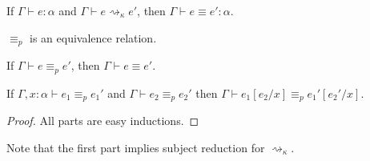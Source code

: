 \begin{lemma}
\begin{thmlist}
\item If $\Gamma\vdash e:\alpha$ and $\Gamma\vdash e\rightsquigarrow_\kappa e'$, then $\Gamma\vdash e\equiv e':\alpha$.
\item $\equiv_p$ is an equivalence relation.
\item If $\Gamma\vdash e\equiv_p e'$, then $\Gamma\vdash e\equiv e'$.
\item\label{item:p_subst} If $\Gamma,x:\alpha\vdash e_1\equiv_p e_1'$ and $\Gamma\vdash e_2\equiv_p e_2'$ then $\Gamma\vdash e_1[e_2/x]\equiv_p e_1'[e_2'/x]$.
\end{thmlist}
\end{lemma}
\begin{proof}
All parts are easy inductions.
\end{proof}
Note that the first part implies subject reduction for $\rightsquigarrow_\kappa$.

